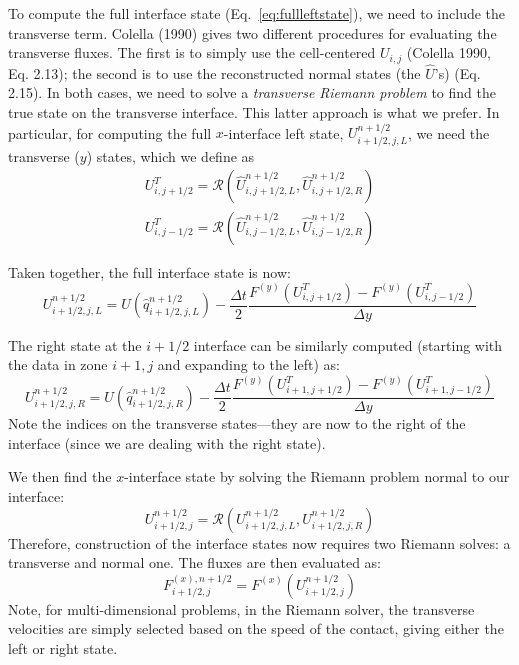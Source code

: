 \documentclass[11pt]{article}
\begin{document}
To compute the full interface state (Eq.~\ref{eq:fullleftstate}), we 
need to include the transverse term.
Colella (1990) gives two different procedures for evaluating the
transverse fluxes.  The first is to simply use the cell-centered
$U_{i,j}$ (Colella 1990,
Eq. 2.13); the second is to use the reconstructed normal states (the
$\hat{U}$'s) (Eq. 2.15).  In both cases, we need to solve a {\em
  transverse Riemann problem} to find the true state on the transverse
interface.  This latter approach is what we prefer.  In particular, 
for computing the full $x$-interface left state, $U_{i+1/2,j,L}^{n+1/2}$, we need the 
transverse ($y$) states, which we define as
\begin{eqnarray}
U^T_{i,j+1/2} = \mathcal{R}(\hat{U}^{n+1/2}_{i,j+1/2,L}, 
                            \hat{U}^{n+1/2}_{i,j+1/2,R}) \\
U^T_{i,j-1/2} = \mathcal{R}(\hat{U}^{n+1/2}_{i,j-1/2,L}, 
                            \hat{U}^{n+1/2}_{i,j-1/2,R})
\end{eqnarray}

Taken together, the full interface state is now:
\begin{equation}
U_{i+1/2,j,L}^{n+1/2} = U(\hat{q}_{i+1/2,j,L}^{n+1/2}) 
   - \frac{\Delta t}{2} \frac{F^{(y)}(U^T_{i,j+1/2}) - F^{(y)}(U^T_{i,j-1/2})}{\Delta y}
\end{equation}

The right state at the $i+1/2$ interface can be similarly computed (starting with the
data in zone $i+1,j$ and expanding to the left) as:
\begin{equation}
U_{i+1/2,j,R}^{n+1/2} = U(\hat{q}_{i+1/2,j,R}^{n+1/2}) 
   - \frac{\Delta t}{2} \frac{F^{(y)}(U^T_{i+1,j+1/2}) - F^{(y)}(U^T_{i+1,j-1/2})}{\Delta y}
\end{equation}
Note the indices on the transverse states---they are now to the right of the interface (since
we are dealing with the right state).

We then find the $x$-interface state by solving the Riemann problem
normal to our interface:
\begin{equation}
U_{i+1/2,j}^{n+1/2} = \mathcal{R}(U_{i+1/2,j,L}^{n+1/2}, U_{i+1/2,j,R}^{n+1/2})
\end{equation}
Therefore, construction of the interface states now requires two
Riemann solves: a transverse and normal one.  The fluxes are then evaluated as:
\begin{equation}
F^{(x),n+1/2}_{i+1/2,j} = F^{(x)}(U_{i+1/2,j}^{n+1/2})
\end{equation}
Note, for multi-dimensional problems, in the Riemann solver, the transverse
velocities are simply selected based on the speed of the contact, giving
either the left or right state.
 
\end{document}
